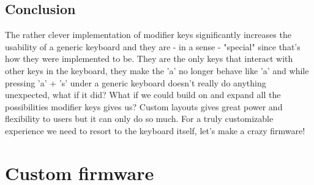 \documentclass[11pt]{article}
\begin{document}
\subsection{Conclusion}
\label{sec:org3c19757}
The rather clever implementation of modifier keys significantly increases the usability of a generic keyboard and they are - in a sense - "special" since that's how they were implemented to be. They are the only keys that interact with other keys in the keyboard, they make the 'a' no longer behave like 'a' and while pressing 'a' + 's' under a generic keyboard doesn't really do anything unexpected, what if it did? What if we could build on and expand all the possibilities modifier keys gives us? Custom layouts gives great power and flexibility to users but it can only do so much. For a truly customizable experience we need to resort to the keyboard itself, let's make a crazy firmware!

\section{Custom firmware}
\label{sec:orga2cb4f1}
\end{document}
